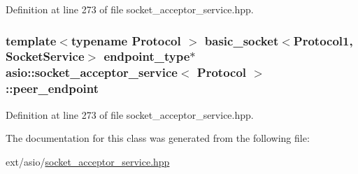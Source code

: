 Definition at line 273 of file socket\+\_\+acceptor\+\_\+service.\+hpp.

\hypertarget{classasio_1_1socket__acceptor__service_a680888264a952847bd9942de4444e183}{}
\subsubsection[{peer\+\_\+endpoint}]{\setlength{\rightskip}{0pt plus 5cm}template$<$typename Protocol $>$ {\bf basic\+\_\+socket}$<$Protocol1, Socket\+Service$>$ {\bf endpoint\+\_\+type}$\ast$ {\bf asio\+::socket\+\_\+acceptor\+\_\+service}$<$ Protocol $>$\+::peer\+\_\+endpoint}\label{classasio_1_1socket__acceptor__service_a680888264a952847bd9942de4444e183}


Definition at line 273 of file socket\+\_\+acceptor\+\_\+service.\+hpp.



The documentation for this class was generated from the following file\+:\begin{DoxyCompactItemize}
\item 
ext/asio/\hyperlink{socket__acceptor__service_8hpp}{socket\+\_\+acceptor\+\_\+service.\+hpp}\end{DoxyCompactItemize}
